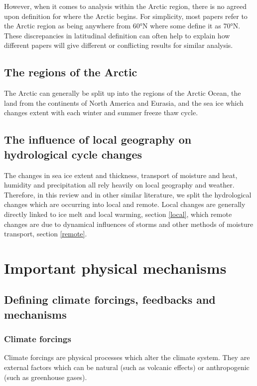 \documentclass[12pt, oneside]{article}
\begin{document}
However, when it comes to analysis within the Arctic region, there is no agreed upon definition for where the Arctic begins. For simplicity, most papers refer to the Arctic region as being anywhere from 60°N where some define it as 70°N\cite{Ghatak2013, serreze2012recent}. These discrepancies in latitudinal definition can often help to explain how different papers will give different or conflicting results for similar analysis.%
\subsection{The regions of the Arctic}
The Arctic can generally be split up into the regions of the Arctic Ocean, the land from the continents of North America and Eurasia, and the sea ice which changes extent with each winter and summer freeze thaw cycle. 

\subsection{The influence of local geography on hydrological cycle changes}
The changes in sea ice extent and thickness, transport of moisture and heat, humidity and precipitation all rely heavily on local geography and weather. Therefore, in this review and in other similar literature, we split the hydrological changes which are occurring into local and remote. Local changes are generally directly linked to ice melt and local warming, section \ref{local}, which remote changes are due to dynamical influences of storms and other methods of moisture transport, section \ref{remote}.




\section{Important physical mechanisms}\label{mechanisms}

\subsection{Defining climate forcings, feedbacks and mechanisms}
\subsubsection{Climate forcings}
Climate forcings are physical processes which alter the climate system. They are external factors which can be natural (such as volcanic effects) or anthropogenic (such as greenhouse gases). 
\end{document}

